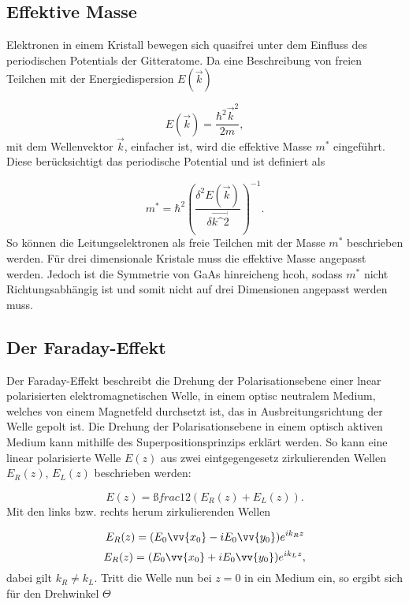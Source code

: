 \subsection{Effektive Masse}
Elektronen in einem Kristall bewegen sich quasifrei unter dem Einfluss des periodischen Potentials der Gitteratome.
Da eine Beschreibung von freien Teilchen mit der Energiedispersion $E(\vec{k})$

\begin{equation}
    E(\vec{k}) = \frac{\hbar^2 \vec{k}^2}{2m},
\end{equation}
mit dem Wellenvektor $\vec{k}$, einfacher ist, wird die effektive Masse $m^*$ eingeführt.
Diese berücksichtigt das periodische Potential und ist definiert als 

\begin{equation}
    m^* = \hbar^2 \left(\frac{\delta^2 E(\vec{k})}{\delta \vec{k\^2}}\right)^{-1}.
\end{equation}
So können die Leitungselektronen als freie Teilchen mit der Masse $m^*$ beschrieben werden.
Für drei dimensionale Kristale muss die effektive Masse angepasst werden. 
Jedoch ist die Symmetrie von GaAs hinreicheng hcoh, sodass $m^*$ nicht Richtungsabhängig ist und somit 
nicht auf drei Dimensionen angepasst werden muss.

\subsection{Der Faraday-Effekt}
Der Faraday-Effekt beschreibt die Drehung der Polarisationsebene einer lnear polarisierten elektromagnetischen Welle, 
in einem optisc neutralem Medium, welches von einem Magnetfeld durchsetzt ist, das in Ausbreitungsrichtung der 
Welle gepolt ist.
Die Drehung der Polarisationsebene in einem optisch aktiven Medium kann mithilfe des Superpositionsprinzips erklärt werden.
So kann eine linear polarisierte Welle $E(z)$ aus zwei eintgegengesetz zirkulierenden Wellen $E_R(z)$, $E_L(z)$ 
beschrieben werden:

\begin{equation}
    E(z) = ßfrac{1}{2} \left(E_R(z) + E_L(z)\right).
\end{equation}
Mit den links bzw. rechts herum zirkulierenden Wellen

\begin{equation}
    E_R(z) = (E_0 \vv{x_0} - i E_0 \vv{y_0}) e^{i k_R z}
\end{equation}
\begin{equation}
    E_R(z) = (E_0 \vv{x_0} + i E_0 \vv{y_0}) e^{i k_L z},
\end{equation}
dabei gilt $k_R \neq k_L$.
Tritt die Welle nun bei $z = 0$ in ein Medium ein, so ergibt sich für den Drehwinkel $\Theta$ 

